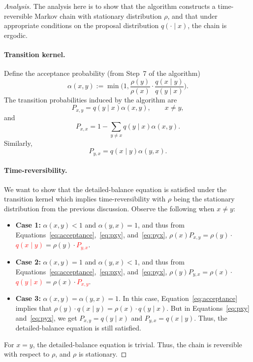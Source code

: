 \documentclass[12pt,a4paper]{article}
\newenvironment{analysis}[1][Analysis]%
{\begin{proof}[#1]}%
	{\end{proof}}
\begin{document}
	\begin{analysis}
		The analysis here is to show that the algorithm constructs a time-reversible Markov chain with stationary distribution \(\rho\), and that under appropriate conditions on the proposal distribution \(q(\cdot\mid x)\), the chain is ergodic.
		\paragraph{Transition kernel.}
		Define the acceptance probability (from Step~7 of the algorithm)
		\begin{equation}
		\label{eq:acceptance}
			\alpha(x,y) :=\min\Big(1, \frac{\rho(y)}{\rho(x)}\cdot\frac{q(x\mid y)}{q(y\mid x)}\Big).
		\end{equation}
		The transition probabilities induced by the algorithm are
		\begin{equation}
		\label{eq:pxy}
			P_{x,y}=q(y\mid x)\alpha(x,y), \qquad x\neq y,
		\end{equation}
		and
		\begin{equation}
		\label{eq:self_loop}
			P_{x,x} = 1-\sum_{y\neq x}q(y\mid x)\alpha(x,y).
		\end{equation}
		Similarly,
		\begin{equation}
		\label{eq:pyx}
			P_{y,x} = q(x\mid y)\alpha(y,x).
		\end{equation}
		
		\paragraph{Time-reversibility.} We want to show that the detailed-balance equation is satisfied under the transition kernel which implies time-reversibility with \(\rho\) being the stationary distribution from the previous discussion. Observe the following when \(x \neq y\):
		\begin{itemize}
			\item \textbf{Case 1:} \(\alpha(x,y) < 1\) and \(\alpha(y,x) = 1\), and thus from Equations~\ref{eq:acceptance},~\ref{eq:pxy}, and~\ref{eq:pyx}, \(\rho(x)P_{x,y} = \rho(y)\cdot\)\textcolor{red}{\(q(x\mid y)\)}\(=\rho(y)\cdot\)\textcolor{red}{\(P_{y,x}\)}.
			\item \textbf{Case 2:} \(\alpha(x,y) = 1\) and \(\alpha(y,x) < 1\), and thus from Equations~\ref{eq:acceptance},~\ref{eq:pxy}, and~\ref{eq:pyx}, \(\rho(y)P_{y,x} = \rho(x)\cdot\)\textcolor{red}{\(q(y\mid x)\)}\(=\rho(x)\cdot\)\textcolor{red}{\(P_{x,y}\)}.
			\item \textbf{Case 3:} \(\alpha(x,y) = \alpha(y,x) = 1\). In this case, Equation~\ref{eq:acceptance} implies that \(\rho(y)\cdot q(x\mid y) = \rho(x)\cdot q(y\mid x)\). But in Equations~\ref{eq:pxy} and~\ref{eq:pyx}, we get \(P_{x,y} = q(y \mid x)\) and \(P_{y,x} = q(x \mid y)\). Thus, the detailed-balance equation is still satisfied.
		\end{itemize}
		For \(x=y\), the detailed-balance equation is trivial. Thus, the chain is reversible with respect to \(\rho\), and \(\rho\) is stationary.
		

\end{analysis}
\end{document}
